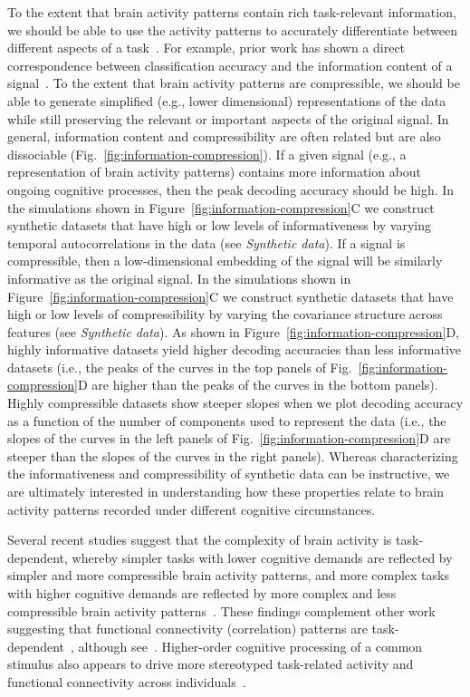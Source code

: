 \documentclass[english, 11pt]{article}
\begin{document}
To the extent that brain activity patterns contain rich task-relevant
information, we should be able to use the activity patterns to accurately
differentiate between different aspects of a task~\citep[e.g., using pattern
classifiers;][]{NormEtal06b}. For example, prior work has shown a direct
correspondence between classification accuracy and the information content of a
signal~\citep{Alva02}. To the extent that brain activity patterns are
compressible, we should be able to generate simplified (e.g., lower
dimensional) representations of the data while still preserving the relevant or
important aspects of the original signal. In general, information content and
compressibility are often related but are also dissociable
(Fig.~\ref{fig:information-compression}). If a given signal (e.g., a
representation of brain activity patterns) contains more information about
ongoing cognitive processes, then the peak decoding accuracy should be high. In
the simulations shown in Figure~\ref{fig:information-compression}C we construct
synthetic datasets that have high or low levels of informativeness by varying
temporal autocorrelations in the data (see \textit{Synthetic data}).
If a signal is compressible, then a low-dimensional embedding of the signal
will be similarly informative as the original signal.  In the simulations
shown in Figure~\ref{fig:information-compression}C we construct synthetic
datasets that have high or low levels of compressibility by varying
the covariance structure across features (see \textit{Synthetic data}).  As shown
in Figure~\ref{fig:information-compression}D, highly informative datasets
yield higher decoding accuracies than less informative datasets (i.e., the peaks of the curves in
the top panels of Fig.~\ref{fig:information-compression}D are higher than the
peaks of the curves in the bottom panels). Highly compressible datasets show
steeper slopes when we plot decoding accuracy as a function of the number of
components used to represent the data (i.e., the slopes of the curves in the
left panels of Fig.~\ref{fig:information-compression}D are steeper than the
slopes of the curves in the right panels).  Whereas characterizing
the informativeness and compressibility of synthetic data can be instructive,
we are ultimately interested in understanding how these properties relate to
brain activity patterns recorded under different cognitive circumstances.

Several recent studies suggest that the complexity of brain activity is
task-dependent, whereby simpler tasks with lower cognitive demands are
reflected by simpler and more compressible brain activity patterns, and more
complex tasks with higher cognitive demands are reflected by more complex and
less compressible brain activity patterns~\citep{MackEtal20, OwenEtal21}. These
findings complement other work suggesting that functional connectivity
(correlation) patterns are task-dependent~\citep{FinnEtal17, OwenEtal20,
ColeEtal14}, although see~\cite{GratEtal18}. Higher-order cognitive processing
of a common stimulus also appears to drive more stereotyped task-related
activity and functional connectivity across individuals~\citep{HassEtal08,
LernEtal11, SimoChan20, SimoEtal16}.
\end{document}

